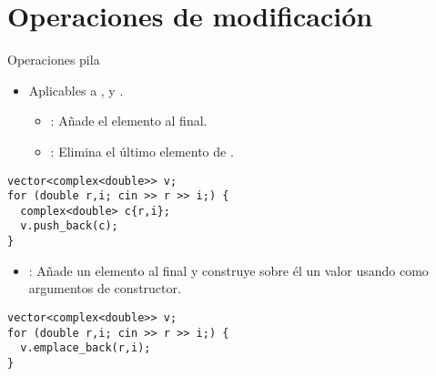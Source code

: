 \section{Operaciones de modificación}

\begin{frame}[t,fragile]{Operaciones pila}
\begin{itemize}
  \item Aplicables a ,  y .
    \begin{itemize}
      \item {}: Añade el elemento  al final.
      \item {}: Elimina el último elemento de .
    \end{itemize}
\end{itemize}
\begin{lstlisting}
vector<complex<double>> v;
for (double r,i; cin >> r >> i;) {
  complex<double> c{r,i};
  v.push_back(c);
}
\end{lstlisting}
    \begin{itemize}
      \item {}: Añade un elemento al final y construye sobre él
             un valor usando  como argumentos de constructor.
    \end{itemize}
\begin{lstlisting}
vector<complex<double>> v;
for (double r,i; cin >> r >> i;) {
  v.emplace_back(r,i);
}
\end{lstlisting}
\end{frame}

